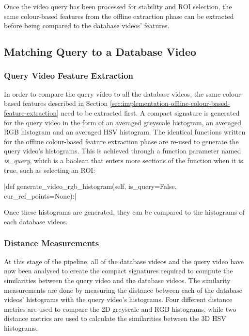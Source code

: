 Once the video query has been processed for stability and ROI selection, the same colour-based features from the offline extraction phase can be extracted before being compared to the database videos' features.


\subsection{Matching Query to a Database Video}

\subsubsection{Query Video Feature Extraction}

In order to compare the query video to all the database videos, the same colour-based features described in Section \ref{sec:implementation-offline-colour-based-feature-extraction} need to be extracted first. A compact signature is generated for the query video in the form of an averaged greyscale histogram, an averaged RGB histogram and an averaged HSV histogram. The identical functions written for the offline colour-based feature extraction phase are re-used to generate the query video's histograms. This is achieved through a function parameter named \textit{is\_query}, which is a boolean that enters more sections of the function when it is true, such as selecting an ROI:

|def generate_video_rgb_histogram(self, is_query=False, cur_ref_points=None):|

Once these histograms are generated, they can be compared to the histograms of each database videos.

\subsubsection{Distance Measurements}

At this stage of the pipeline, all of the database videos and the query video have now been analysed to create the compact signatures required to compute the similarities between the query video and the database videos. The similarity measurements are done by measuring the distance between each of the database videos' histograms with the query video's histograms. Four different distance metrics are used to compare the 2D greyscale and RGB histograms, while two distance metrics are used to calculate the similarities between the 3D HSV histograms.\\

